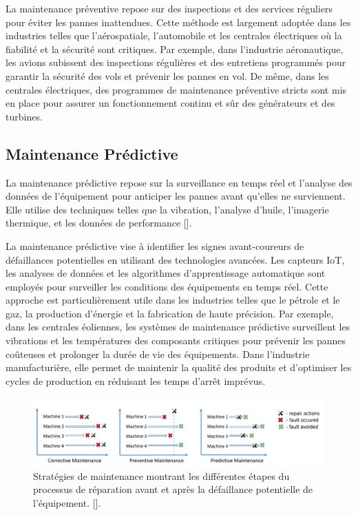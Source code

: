 La maintenance préventive repose sur des inspections et des services réguliers
pour éviter les pannes inattendues. Cette méthode est largement adoptée dans
les industries telles que l'aérospatiale, l'automobile et les centrales
électriques où la fiabilité et la sécurité sont critiques. Par exemple, dans
l'industrie aéronautique, les avions subissent des inspections régulières et
des entretiens programmés pour garantir la sécurité des vols et prévenir les
pannes en vol. De même, dans les centrales électriques, des programmes de
maintenance préventive stricts sont mis en place pour assurer un fonctionnement
continu et sûr des générateurs et des turbines.

\subsection{Maintenance Prédictive}
La maintenance prédictive repose sur la surveillance en temps réel et l’analyse
des données de l’équipement pour anticiper les pannes avant qu’elles ne
surviennent. Elle utilise des techniques telles que la vibration, l’analyse
d’huile, l’imagerie thermique, et les données de performance​
[\cite{Bentivogli2023, Sangeetha2017}].

La maintenance prédictive vise à identifier les signes avant-coureurs de
défaillances potentielles en utilisant des technologies avancées. Les capteurs
IoT, les analyses de données et les algorithmes d'apprentissage automatique
sont employés pour surveiller les conditions des équipements en temps réel.
Cette approche est particulièrement utile dans les industries telles que le
pétrole et le gaz, la production d'énergie et la fabrication de haute
précision. Par exemple, dans les centrales éoliennes, les systèmes de
maintenance prédictive surveillent les vibrations et les températures des
composants critiques pour prévenir les pannes coûteuses et prolonger la durée
de vie des équipements. Dans l'industrie manufacturière, elle permet de
maintenir la qualité des produits et d'optimiser les cycles de production en
réduisant les temps d'arrêt imprévus.

\begin{figure}[hbt!]
	\centering
	\includegraphics[width=12cm]{images_pfe/predictive.png}
	\caption{Stratégies de maintenance montrant les différentes étapes du processus de réparation avant et après la défaillance potentielle de l'équipement. [\cite{Mrozek2023}].}
	\label{fig:transformer}
\end{figure}
\FloatBarrier

